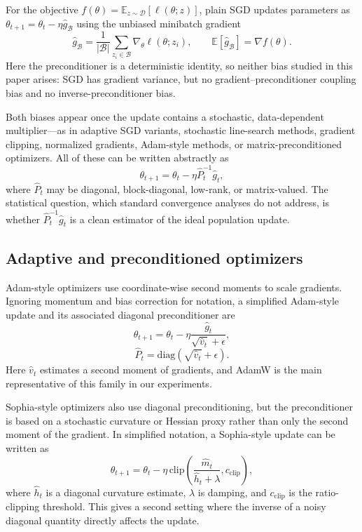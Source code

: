 \documentclass{article}
\newcommand{\E}{\mathbb{E}}
\newcommand{\D}{\mathcal{D}}
\newcommand{\B}{\mathcal{B}}
\begin{document}
For the objective $f(\theta) = \E_{z \sim \D}[\ell(\theta; z)]$, plain SGD updates parameters as $\theta_{t+1} = \theta_t - \eta \hat g_\B$ using the unbiased minibatch gradient
\begin{equation}
    \hat g_\B = \frac{1}{|\B|}\sum_{z_i \in \B} \nabla_\theta \ell(\theta; z_i),
    \qquad
    \E[\hat g_\B] = \nabla f(\theta).
\end{equation}
Here the preconditioner is a deterministic identity, so neither bias studied in this paper arises: SGD has gradient variance, but no gradient--preconditioner coupling bias and no inverse-preconditioner bias.

Both biases appear once the update contains a stochastic, data-dependent multiplier---as in adaptive SGD variants, stochastic line-search methods, gradient clipping, normalized gradients, Adam-style methods, or matrix-preconditioned optimizers.
All of these can be written abstractly as
\begin{equation}
    \theta_{t+1} = \theta_t - \eta \hat P_t^{-1} \hat g_t,
\end{equation}
where $\hat P_t$ may be diagonal, block-diagonal, low-rank, or matrix-valued. 
The statistical question, which standard convergence analyses do not address, is whether $\hat P_t^{-1}\hat g_t$ is a clean estimator of the ideal population update.

\subsection{Adaptive and preconditioned optimizers}

Adam-style optimizers use coordinate-wise second moments to scale gradients. Ignoring momentum and bias correction for notation, a simplified Adam-style update and its associated diagonal preconditioner are
\begin{equation}
    \theta_{t+1} = \theta_t - \eta \frac{\hat g_t}{\sqrt{\hat v_t} + \epsilon},
\end{equation}
\begin{equation}
    \hat P_t = \mathrm{diag}(\sqrt{\hat v_t}+\epsilon).
\end{equation}
Here $\hat v_t$ estimates a second moment of gradients, and AdamW is the main representative of this family in our experiments.

Sophia-style optimizers also use diagonal preconditioning, but the preconditioner is based on a stochastic curvature or Hessian proxy rather than only the second moment of the gradient. In simplified notation, a Sophia-style update can be written as
\begin{equation}
    \theta_{t+1}
    =
    \theta_t
    -
    \eta \, \mathrm{clip}\left(\frac{\hat m_t}{\hat h_t+\lambda}, c_{\mathrm{clip}}\right),
\end{equation}
where $\hat h_t$ is a diagonal curvature estimate, $\lambda$ is damping, and $c_{\mathrm{clip}}$ is the ratio-clipping threshold. This gives a second setting where the inverse of a noisy diagonal quantity directly affects the update.
\end{document}
